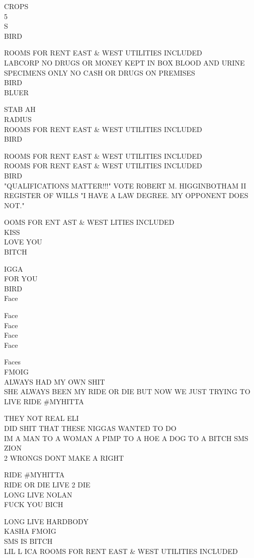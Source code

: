 \documentclass[10pt,letterpaper]{article}
\begin{document}
CROPS\\
5\\
S\\
BIRD

ROOMS FOR RENT EAST \& WEST UTILITIES INCLUDED\\
LABCORP NO DRUGS OR MONEY KEPT IN BOX BLOOD AND URINE SPECIMENS ONLY NO CASH OR DRUGS ON PREMISES\\
BIRD\\
BLUER

STAB AH\\
RADIUS\\
ROOMS FOR RENT EAST \& WEST UTILITIES INCLUDED\\
BIRD

ROOMS FOR RENT EAST \& WEST UTILITIES INCLUDED\\
ROOMS FOR RENT EAST \& WEST UTILITIES INCLUDED\\
BIRD\\
"QUALIFICATIONS MATTER!!!" VOTE ROBERT M. HIGGINBOTHAM II REGISTER OF WILLS "I HAVE A LAW DEGREE.  MY OPPONENT DOES NOT."

OOMS FOR ENT AST \& WEST LITIES INCLUDED\\
KISS\\
LOVE YOU\\
BITCH

IGGA\\
FOR YOU\\
BIRD\\
Face

Face\\
Face\\
Face\\
Face

Faces\\
FMOIG\\
ALWAYS HAD MY OWN SHIT\\
SHE ALWAYS BEEN MY RIDE OR DIE BUT NOW WE JUST TRYING TO LIVE RIDE \#MYHITTA

THEY NOT REAL ELI\\
DID SHIT THAT THESE NIGGAS WANTED TO DO\\
IM A MAN TO A WOMAN A PIMP TO A HOE A DOG TO A BITCH SMS ZION\\
2 WRONGS DONT MAKE A RIGHT

RIDE \#MYHITTA\\
RIDE OR DIE LIVE 2 DIE\\
LONG LIVE NOLAN\\
FUCK YOU BICH

LONG LIVE HARDBODY\\
KASHA FMOIG\\
SMS IS BITCH\\
LIL L ICA ROOMS FOR RENT EAST \& WEST UTILITIES INCLUDED
\end{document}
